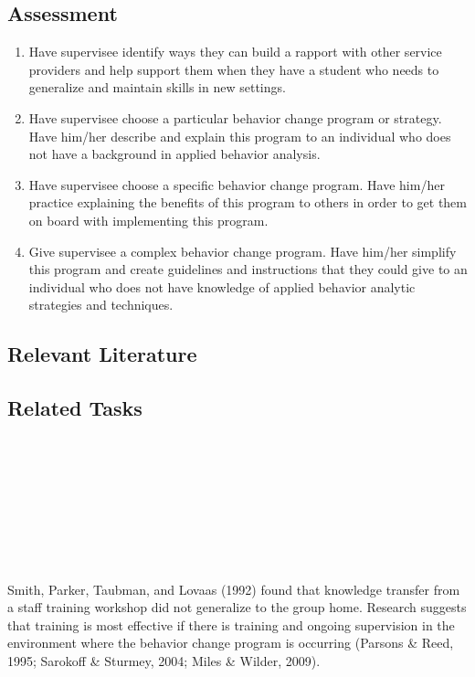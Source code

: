 \subsection{Assessment}
\begin{enumerate}
\item Have supervisee identify ways they can build a rapport with other service providers and help support them when they have a student who needs to generalize and maintain skills in new settings.
\item Have supervisee choose a particular behavior change program or strategy. Have him/her describe and explain this program to an individual who does not have a background in applied behavior analysis. 
\item Have supervisee choose a specific behavior change program. Have him/her practice explaining the benefits of this program to others in order to get them on board with implementing this program.
\item Give supervisee a complex behavior change program. Have him/her simplify this program and create guidelines and instructions that they could give to an individual who does not have knowledge of applied behavior analytic strategies and techniques. 
\end{enumerate}
%
\subsection{Relevant Literature}
\begin{refsection}
\nocite{cooper2007applied,
        jarmolowicz2008effects,
        stokes1974programming}
\printbibliography[heading=none]
\end{refsection}
%
\subsection{Related Tasks}
\fourhOne{}\\
\fourjOne{}\\
\fourkThree{}\\
\fourkFour{}\\
\fourkSix{}\\
\fourkEight{}\\
%
\clearpage \section{\fourkSix{}}
Smith, Parker, Taubman, and Lovaas (1992) found that knowledge transfer from a staff training workshop did not generalize to the group home.  Research suggests that training is most effective if there is training and ongoing supervision in the environment where the behavior change program is occurring (Parsons \& Reed, 1995; Sarokoff \& Sturmey, 2004; Miles \& Wilder, 2009).

